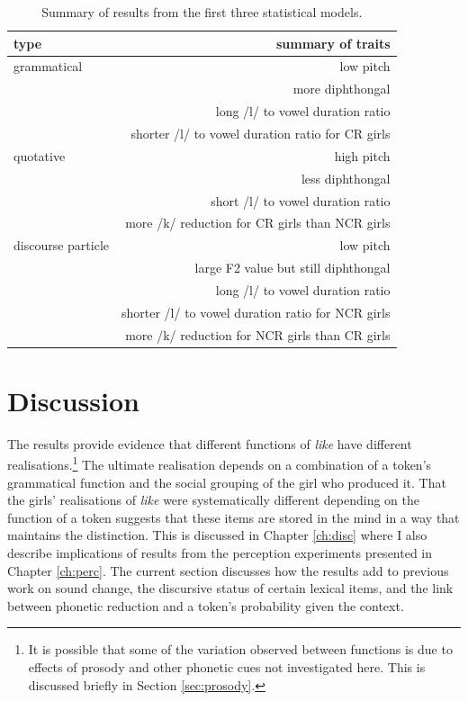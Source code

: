   
\begin{table}[ht]
\begin{center}
\begin{tabular}{lr}
  \hline
 type & summary of traits \\
 \hline
 
 grammatical & low pitch   \\
             & more diphthongal \\
             & long /l/ to vowel duration ratio \\
             & shorter /l/ to vowel duration ratio for CR girls \\
             
             \hline
 quotative   & high pitch \\
             & less diphthongal \\
             & short /l/ to vowel duration ratio \\
             & more /k/ reduction for CR girls than NCR girls \\
             \hline
             
 discourse particle & low pitch \\
        		 & large F2 value but still diphthongal \\
             & long /l/ to vowel duration ratio \\
             & shorter /l/ to vowel duration ratio for NCR girls \\
             & more /k/ reduction for NCR girls than CR girls \\
  \hline

\end{tabular}
\caption{Summary of results from the first three statistical models.}
\label{tab:sumprodresults}
\end{center}
\end{table}


\section{Discussion}\label{sec:proddisc}

The results provide evidence that different functions of \textit{like} have different realisations.\footnote{It is possible that some of the variation observed between functions is due to effects of prosody and other phonetic cues not investigated here.  This is discussed briefly in Section \ref{sec:prosody}.}  The ultimate realisation depends on a combination of a token's grammatical function and the social grouping of the girl who produced it.  That the girls' realisations of \textit{like} were systematically different depending on the function of a token suggests that these items are stored in the mind in a way that maintains the distinction.  This is discussed in Chapter \ref{ch:disc} where I also describe implications of results from the perception experiments presented in Chapter \ref{ch:perc}.  The current section discusses how the results add to previous work on sound change, the discursive status of certain lexical items, and the link between phonetic reduction and a token's probability given the context.  
% 


